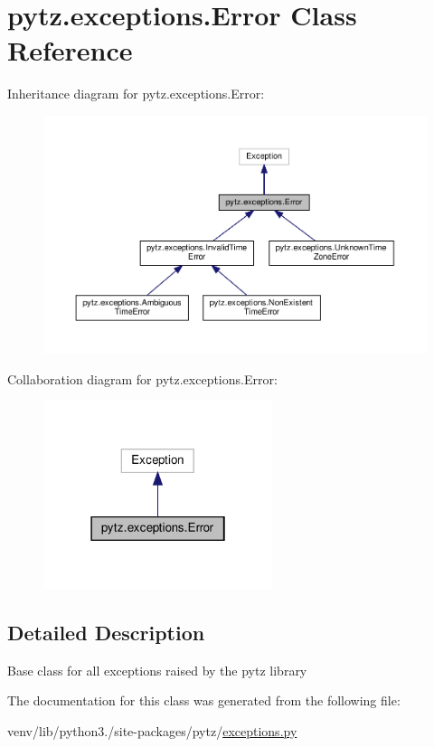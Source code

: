 \hypertarget{classpytz_1_1exceptions_1_1Error}{}\section{pytz.\+exceptions.\+Error Class Reference}
\label{classpytz_1_1exceptions_1_1Error}


Inheritance diagram for pytz.\+exceptions.\+Error\+:
\nopagebreak
\begin{figure}[H]
\begin{center}
\leavevmode
\includegraphics[width=350pt]{classpytz_1_1exceptions_1_1Error__inherit__graph}
\end{center}
\end{figure}


Collaboration diagram for pytz.\+exceptions.\+Error\+:
\nopagebreak
\begin{figure}[H]
\begin{center}
\leavevmode
\includegraphics[width=190pt]{classpytz_1_1exceptions_1_1Error__coll__graph}
\end{center}
\end{figure}


\subsection{Detailed Description}
\begin{DoxyVerb}Base class for all exceptions raised by the pytz library\end{DoxyVerb}
 

The documentation for this class was generated from the following file\+:\begin{DoxyCompactItemize}
\item 
venv/lib/python3./site-\/packages/pytz/\hyperlink{pytz_2exceptions_8py}{exceptions.\+py}\end{DoxyCompactItemize}

